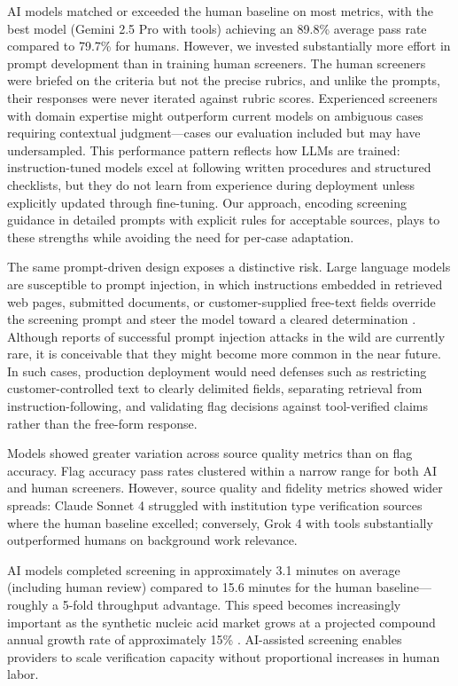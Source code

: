 \documentclass[utf8]{FrontiersinHarvard}
\begin{document}
AI models matched or exceeded the human baseline on most metrics, with the best model (Gemini 2.5 Pro with tools) achieving an 89.8\% average pass rate compared to 79.7\% for humans. However, we invested substantially more effort in prompt development than in training human screeners. The human screeners were briefed on the criteria but not the precise rubrics, and unlike the prompts, their responses were never iterated against rubric scores. Experienced screeners with domain expertise might outperform current models on ambiguous cases requiring contextual judgment—cases our evaluation included but may have undersampled. This performance pattern reflects how LLMs are trained: instruction-tuned models excel at following written procedures and structured checklists, but they do not learn from experience during deployment unless explicitly updated through fine-tuning. Our approach, encoding screening guidance in detailed prompts with explicit rules for acceptable sources, plays to these strengths while avoiding the need for per-case adaptation.

The same prompt-driven design exposes a distinctive risk. Large language models are susceptible to prompt injection, in which instructions embedded in retrieved web pages, submitted documents, or customer-supplied free-text fields override the screening prompt and steer the model toward a cleared determination \citep{Greshake2023, Zhan2024}. Although reports of successful prompt injection attacks in the wild are currently rare, it is conceivable that they might become more common in the near future. In such cases, production deployment would need defenses such as restricting customer-controlled text to clearly delimited fields, separating retrieval from instruction-following, and validating flag decisions against tool-verified claims rather than the free-form response.

Models showed greater variation across source quality metrics than on flag accuracy. Flag accuracy pass rates clustered within a narrow range for both AI and human screeners. However, source quality and fidelity metrics showed wider spreads: Claude Sonnet 4 struggled with institution type verification sources where the human baseline excelled; conversely, Grok 4 with tools substantially outperformed humans on background work relevance.

AI models completed screening in approximately 3.1 minutes on average (including human review) compared to 15.6 minutes for the human baseline—roughly a 5-fold throughput advantage. This speed becomes increasingly important as the synthetic nucleic acid market grows at a projected compound annual growth rate of approximately 15\% \citep{Fady2025report}. AI-assisted screening enables providers to scale verification capacity without proportional increases in human labor.
\end{document}
